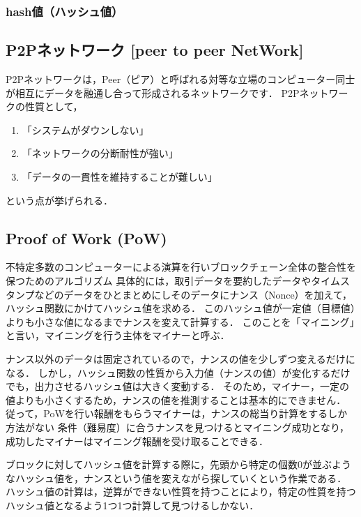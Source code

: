 \documentclass[a4paper,12pt]{jsarticle}
\begin{document}
            \subsubsection{hash値（ハッシュ値）}


      \subsection{P2Pネットワーク [peer to peer NetWork]}%
P2Pネットワークは，Peer（ピア）と呼ばれる対等な立場のコンピューター同士が相互にデータを融通し合って形成されるネットワークです．
P2Pネットワークの性質として，
\begin{enumerate}
  \item 「システムがダウンしない」
  
  \item 「ネットワークの分断耐性が強い」
  
  \item 「データの一貫性を維持することが難しい」
  \end{enumerate}
という点が挙げられる．


      \subsection*{Proof of Work (PoW)}%
不特定多数のコンピューターによる演算を行いブロックチェーン全体の整合性を保つためのアルゴリズム
具体的には，取引データを要約したデータやタイムスタンプなどのデータをひとまとめにしそのデータにナンス（Nonce）を加えて，ハッシュ関数にかけてハッシュ値を求める．
このハッシュ値が一定値（目標値）よりも小さな値になるまでナンスを変えて計算する．
このことを「マイニング」と言い，マイニングを行う主体をマイナーと呼ぶ．


ナンス以外のデータは固定されているので，ナンスの値を少しずつ変えるだけになる．
しかし，ハッシュ関数の性質から入力値（ナンスの値）が変化するだけでも，出力させるハッシュ値は大きく変動する．
そのため，マイナー，一定の値よりも小さくするため，ナンスの値を推測することは基本的にできません．
従って，PoWを行い報酬をもらうマイナーは，ナンスの総当り計算をするしか方法がない
条件（難易度）に合うナンスを見つけるとマイニング成功となり，成功したマイナーはマイニング報酬を受け取ることできる．

ブロックに対してハッシュ値を計算する際に，先頭から特定の個数$0$が並ぶようなハッシュ値を，ナンスという値を変えながら探していくという作業である．
ハッシュ値の計算は，逆算ができない性質を持つことにより，特定の性質を持つハッシュ値となるよう1つ1つ計算して見つけるしかない．
\end{document}
